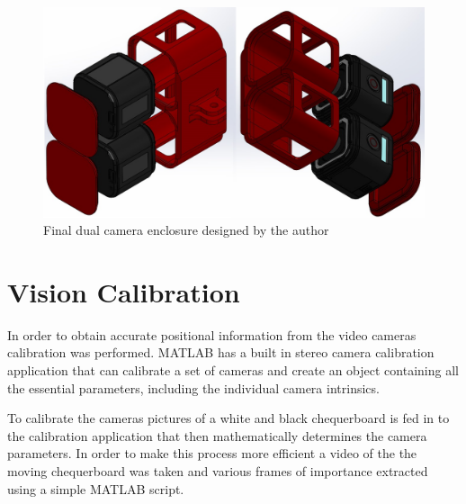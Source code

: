 \begin{figure}[!ht] 
\captionsetup{width=\linewidth, font=small}  
\includegraphics[width=\linewidth]{figures/stereoholder.JPG}
\caption{Final dual camera enclosure designed by the author}
\label{fig:stereoholder}
\end{figure}



\section{Vision Calibration}
In order to obtain accurate positional information from the video cameras calibration was performed. MATLAB has a built in stereo camera calibration application that can calibrate a set of cameras and create an object containing all the essential parameters, including the individual camera intrinsics.

To calibrate the cameras pictures of a white and black chequerboard is fed in to the calibration application that then mathematically determines the camera parameters. In order to make this process more efficient a video of the the moving chequerboard was taken and various frames of importance extracted using a simple MATLAB script. 



